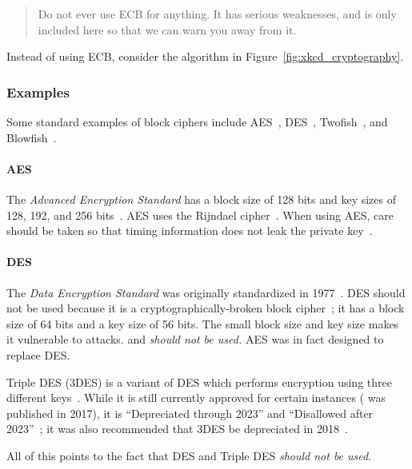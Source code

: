 \begin{quote}
    Do not ever use ECB for anything.
    It has serious weaknesses, and is only included here
    so that we can warn you away from it.
\end{quote}

\noindent
Instead of using ECB, consider the algorithm in
Figure~\ref{fig:xkcd_cryptography}.



\subsubsection{Examples}

Some standard examples of \glspl{block cipher} include
AES~\cite{FIPS-197-2001}, DES~\cite{FIPS-46-3-1977},
Twofish~\cite{TwofishAlg},
and Blowfish~\cite{BlowfishAlg}.

\paragraph{AES} The \emph{Advanced Encryption Standard}
has a block size of 128 bits and key sizes of 128, 192,
and 256 bits~\cite{FIPS-197-2001}.
AES uses the Rijndael cipher~\cite{RijndaelAlg}.
When using AES, care should be taken so that timing information
does not leak the private key~\cite{bernstein2005cache,weiss2012cache}.

\paragraph{DES} The \emph{Data Encryption Standard}
was originally standardized in 1977~\cite{FIPS-46-3-1977}.
DES should not be used because it is a cryptographically-broken
\gls{block cipher}~\cite{rfc4772};
it has a block size of 64 bits and a key size of 56 bits.
The small block size and key size makes it vulnerable to attacks.
and \emph{should not be used.}
AES was in fact designed to replace DES.

Triple DES (3DES) is a variant of DES which performs encryption
using three different keys~\cite{NIST-SP-800-67r2,rfc1851}.
While it is still currently approved for certain instances
(\cite{NIST-SP-800-67r2} was published in 2017),
it is ``Depreciated through 2023'' and
``Disallowed after 2023''~\cite{NIST-SP-800-131Ar2};
it was also recommended that 3DES be depreciated in 2018~\cite{rfc8429}.

All of this points to the fact that DES and Triple DES
\emph{should not be used}.

